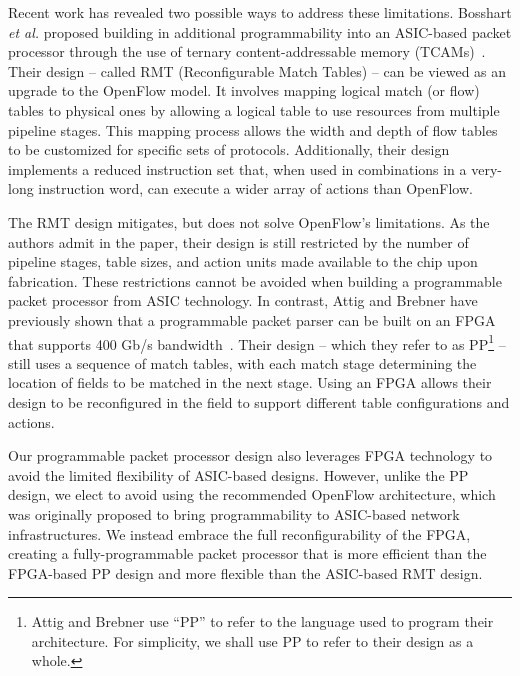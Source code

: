 %
%
%


Recent work has revealed two possible ways to address these limitations.
Bosshart \textit{et al.} proposed building in additional programmability into an ASIC-based packet processor through the use of ternary content-addressable memory (TCAMs)~\cite{bosshart2013forwarding}.
Their design -- called RMT (Reconfigurable Match Tables) -- can be viewed as an upgrade to the OpenFlow model.
It involves mapping logical match (or flow) tables to physical ones by allowing a logical table to use resources from multiple pipeline stages.
This mapping process allows the width and depth of flow tables to be customized for specific sets of protocols.
Additionally, their design implements a reduced instruction set that, when used in combinations in a very-long instruction word, can execute a wider array of actions than OpenFlow.

The RMT design mitigates, but does not solve OpenFlow's limitations.
As the authors admit in the paper, their design is still restricted by the number of pipeline stages, table sizes, and action units made available to the chip upon fabrication.
These restrictions cannot be avoided when building a programmable packet processor from ASIC technology.
In contrast, Attig and Brebner have previously shown that a programmable packet parser can be built on an FPGA that supports 400 Gb/s bandwidth~\cite{attig2011400}.
Their design -- which they refer to as PP\footnote{Attig and Brebner use ``PP'' to refer to the language used to program their architecture. For simplicity, we shall use PP to refer to their design as a whole.} -- still uses a sequence of match tables, with each match stage determining the location of fields to be matched in the next stage.
Using an FPGA allows their design to be reconfigured in the field to support different table configurations and actions.

Our programmable packet processor design also leverages FPGA technology to avoid the limited flexibility of ASIC-based designs.
However, unlike the PP design, we elect to avoid using the recommended OpenFlow architecture, which was originally proposed to bring programmability to ASIC-based network infrastructures.
We instead embrace the full reconfigurability of the FPGA, creating a fully-programmable packet processor that is more efficient than the FPGA-based PP design and more flexible than the ASIC-based RMT design.

